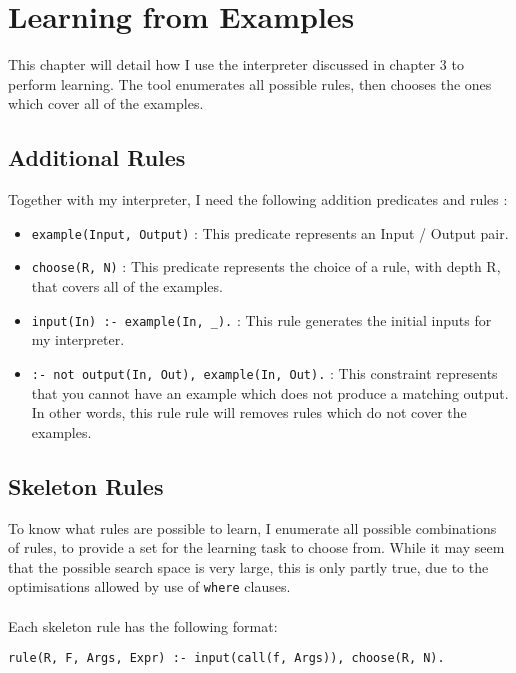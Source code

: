 \chapter{Learning from Examples}

This chapter will detail how I use the interpreter discussed in chapter 3 to perform learning. The tool enumerates all possible rules, then chooses the ones which cover all of the examples.

\section{Additional Rules}
Together with my interpreter, I need the following addition predicates and rules :
\begin{itemize}
\item \lstinline{example(Input, Output)} : This predicate represents an Input / Output pair.
\item \lstinline{choose(R, N)} : This predicate represents the choice of a rule, with depth R, that covers all of the examples.
\item \lstinline{input(In) :- example(In, _).} : This rule generates the initial inputs for my interpreter.
\item \lstinline{:- not output(In, Out), example(In, Out).}  : This constraint represents that you cannot have an example which does not produce a matching output. In other words, this rule rule will removes rules which do not cover the examples.
\end{itemize}

\section{Skeleton Rules}
To know what rules are possible to learn, I enumerate all possible combinations of rules, to provide a set for the learning task to choose from. While it may seem that the possible search space is very large, this is only partly true, due to the optimisations allowed by use of \lstinline{where} clauses. \\ \\ %
Each skeleton rule has the following format:

\lstinline{rule(R, F, Args, Expr) :- input(call(f, Args)), choose(R, N).} %
\mbox{} \\


